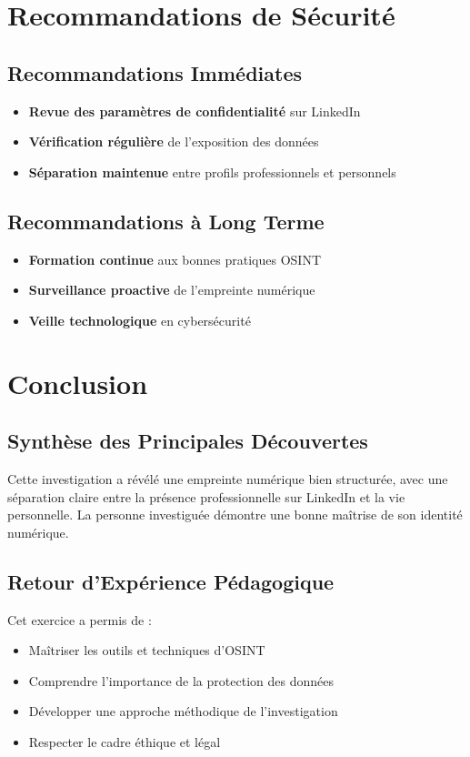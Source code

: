 \documentclass[12pt, a4paper]{article}
\begin{document}
\section{Recommandations de Sécurité}
\subsection{Recommandations Immédiates}
\begin{itemize}
    \item \textbf{Revue des paramètres de confidentialité} sur LinkedIn
    \item \textbf{Vérification régulière} de l'exposition des données
    \item \textbf{Séparation maintenue} entre profils professionnels et personnels
\end{itemize}

\subsection{Recommandations à Long Terme}
\begin{itemize}
    \item \textbf{Formation continue} aux bonnes pratiques OSINT
    \item \textbf{Surveillance proactive} de l'empreinte numérique
    \item \textbf{Veille technologique} en cybersécurité
\end{itemize}

\section{Conclusion}
\subsection{Synthèse des Principales Découvertes}
Cette investigation a révélé une empreinte numérique bien structurée, avec une séparation claire entre la présence professionnelle sur LinkedIn et la vie personnelle. La personne investiguée démontre une bonne maîtrise de son identité numérique.

\subsection{Retour d'Expérience Pédagogique}
Cet exercice a permis de :
\begin{itemize}
    \item Maîtriser les outils et techniques d'OSINT
    \item Comprendre l'importance de la protection des données
    \item Développer une approche méthodique de l'investigation
    \item Respecter le cadre éthique et légal
\end{itemize}
\end{document}
